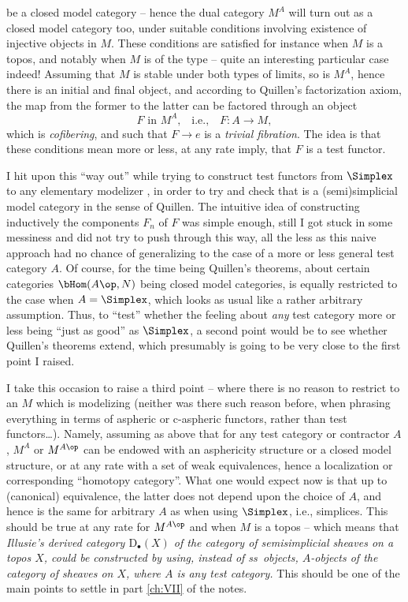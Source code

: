 be a closed model category -- hence the dual category $M^A$ will turn
out as a closed model category too, under suitable conditions
involving existence of injective objects in $M$. These conditions are
satisfied for instance when $M$ is a topos, and notably when $M$ is of
the type \Bhat{} -- quite an interesting particular case indeed!
Assuming that $M$ is stable under both types of limits, so is $M^A$,
hence there is an initial and final object, and according to Quillen's
factorization axiom, the map from the former to the latter can be
factored through an object
\[\text{$F$ in $M^A$,}\quad\text{i.e.,}\quad F:A\to M,\]
which is \emph{cofibering}, and such that $F\to e$ is a \emph{trivial
  fibration}. The idea is that these conditions mean more or less, at
any rate imply, that $F$ is a test functor.

I hit upon this ``way out'' while trying to construct test functors
from $\Simplex$ to any elementary modelizer \Bhat, in order to try and
check that \Bhat{} is a (semi)simplicial model category in the sense
of Quillen. The intuitive idea of constructing inductively the
components $F_n$ of $F$ was simple enough, still I got stuck in some
messiness and did not try to push through this way, all the less as
this naive approach had no chance of generalizing to the case of a
more or less general test category $A$. Of course, for the time being
Quillen's theorems, about certain categories $\bHom(A\op,N)$ being
closed model categories, is equally restricted to the case when
$A=\Simplex$, which looks as usual like a rather arbitrary
assumption. Thus, to ``test'' whether the feeling about \emph{any}
test category more or less being ``just as good'' as $\Simplex$, a
second point would be to see whether Quillen's theorems extend, which
presumably is going to be very close to the first point I raised.

I take this occasion to raise a third point -- where there is no
reason to restrict to an $M$ which is modelizing (neither was there
such reason before, when phrasing everything in terms of aspheric or
c-aspheric functors, rather than test functors\ldots). Namely,
assuming as above that for any test category or contractor
$A$, $M^A$ or $M^{A\op}$ can be endowed with an asphericity structure
or a closed model structure, or at any rate with a set of weak
equivalences, hence a localization or corresponding ``homotopy
category''. What one would expect now is that up to (canonical)
equivalence, the latter does not depend upon the choice of $A$, and
hence is the same for arbitrary $A$ as when using $\Simplex$, i.e.,
simplices. This should be true at any rate for $M^{A\op}$ and when $M$
is a topos -- which means that \emph{Illusie's derived category
  $\mathrm D_\bullet(X)$ of the category of semisimplicial sheaves on
  a topos $X$, could be constructed by using, instead of ss~objects,
  $A$-objects of the category of sheaves on $X$, where $A$ is any test
  category.} This should be one of the main points to settle in part
\ref{ch:VII} of the notes.

